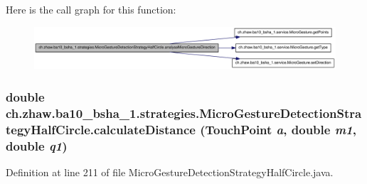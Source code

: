 Here is the call graph for this function:\nopagebreak
\begin{figure}[H]
\begin{center}
\leavevmode
\includegraphics[width=409pt]{classch_1_1zhaw_1_1ba10__bsha__1_1_1strategies_1_1MicroGestureDetectionStrategyHalfCircle_a472dbb75d876bcc2e87a98a0b1afb14c_cgraph}
\end{center}
\end{figure}
\hypertarget{classch_1_1zhaw_1_1ba10__bsha__1_1_1strategies_1_1MicroGestureDetectionStrategyHalfCircle_a41f906c4c42a57ac8d1c6ae417fe6578}{
\subsubsection[{calculateDistance}]{\setlength{\rightskip}{0pt plus 5cm}double ch.zhaw.ba10\_\-bsha\_\-1.strategies.MicroGestureDetectionStrategyHalfCircle.calculateDistance ({\bf TouchPoint} {\em a}, \/  double {\em m1}, \/  double {\em q1})}}
\label{classch_1_1zhaw_1_1ba10__bsha__1_1_1strategies_1_1MicroGestureDetectionStrategyHalfCircle_a41f906c4c42a57ac8d1c6ae417fe6578}


Definition at line 211 of file MicroGestureDetectionStrategyHalfCircle.java.

